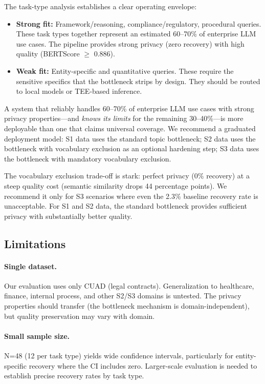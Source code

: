 \documentclass[sigconf,anonymous,review,balance=false]{acmart}
\begin{document}
The task-type analysis establishes a clear operating envelope:

\begin{itemize}
\item \textbf{Strong fit:} Framework/reasoning, compliance/regulatory, procedural queries. These task types together represent an estimated 60--70\% of enterprise LLM use cases. The pipeline provides strong privacy (zero recovery) with high quality (BERTScore $\geq$ 0.886).
\item \textbf{Weak fit:} Entity-specific and quantitative queries. These require the sensitive specifics that the bottleneck strips by design. They should be routed to local models or TEE-based inference.
\end{itemize}

A system that reliably handles 60--70\% of enterprise LLM use cases with strong privacy properties---and \emph{knows its limits} for the remaining 30--40\%---is more deployable than one that claims universal coverage. We recommend a graduated deployment model: S1 data uses the standard topic bottleneck; S2 data uses the bottleneck with vocabulary exclusion as an optional hardening step; S3 data uses the bottleneck with mandatory vocabulary exclusion.

The vocabulary exclusion trade-off is stark: perfect privacy (0\% recovery) at a steep quality cost (semantic similarity drops 44 percentage points). We recommend it only for S3 scenarios where even the 2.3\% baseline recovery rate is unacceptable. For S1 and S2 data, the standard bottleneck provides sufficient privacy with substantially better quality.

\subsection{Limitations}
\label{sec:limitations}

\paragraph{Single dataset.} Our evaluation uses only CUAD (legal contracts). Generalization to healthcare, finance, internal process, and other S2/S3 domains is untested. The privacy properties should transfer (the bottleneck mechanism is domain-independent), but quality preservation may vary with domain.

\paragraph{Small sample size.} N=48 (12 per task type) yields wide confidence intervals, particularly for entity-specific recovery where the CI includes zero. Larger-scale evaluation is needed to establish precise recovery rates by task type.
\end{document}
